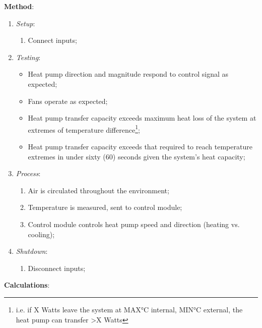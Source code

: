 \documentclass{report}
\begin{document}
\textbf{Method}:
\begin{enumerate}
    \item \textit{Setup}:
    \begin{enumerate}
        \item Connect inputs;
    \end{enumerate}
    \item \textit{Testing}:
    \begin{itemize}
        \item Heat pump direction and magnitude respond to control signal as expected;
        \item Fans operate as expected;
        \item Heat pump transfer capacity exceeds maximum heat loss of the system at extremes of temperature difference\footnote{i.e. if X Watts leave the system at MAX°C internal, MIN°C external, the heat pump can transfer >X Watts};
        \item Heat pump transfer capacity exceeds that required to reach temperature extremes in under sixty (60) seconds given the system's heat capacity;
    \end{itemize}
    \item \textit{Process}:
    \begin{enumerate}
        \item Air is circulated throughout the environment;
        \item Temperature is measured, sent to control module;
        \item Control module controls heat pump speed and direction (heating vs. cooling);
    \end{enumerate}
    \item \textit{Shutdown}:
    \begin{enumerate}
        \item Disconnect inputs;
    \end{enumerate}
\end{enumerate}

\textbf{Calculations}:
\end{document}
